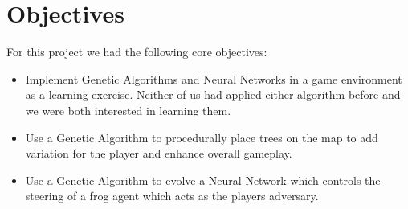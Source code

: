 \section{Objectives}
For this project we had the following core objectives:
\begin{itemize}
\item Implement Genetic Algorithms and Neural Networks in a game environment as a learning exercise. Neither of
us had applied either algorithm before and we were both interested in learning them.
\item Use a Genetic Algorithm to procedurally place trees on the map to add variation for the player
and enhance overall gameplay.
\item Use a Genetic Algorithm to evolve a Neural Network which controls the steering of a frog agent which
acts as the players adversary.
\end{itemize}
